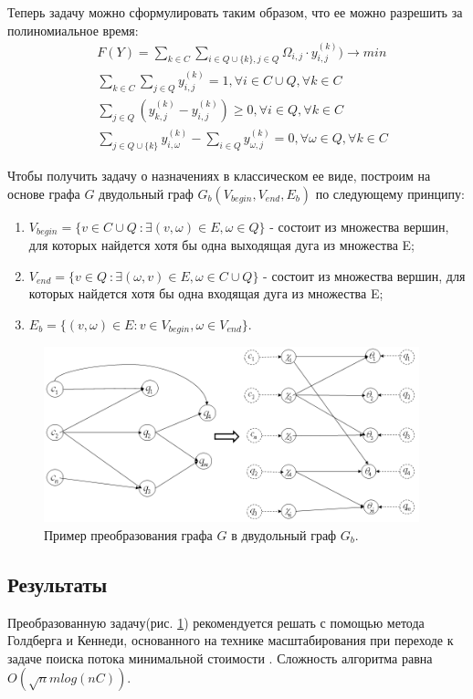 \documentclass[]{TAACpaper}
\begin{document}
Теперь задачу можно сформулировать таким образом, что ее можно разрешить за полиномиальное время:
\begin{align} 
  &F(Y) = 
    \sum_{k \in C}
     \sum_{i \in Q \cup  \{k\},j \in Q} 
     \Omega_{i,j}\cdot y^{(k)}_{i,j})
     \to min\\
& \sum_{k \in C}\sum_{j \in Q}y^{(k)}_{i,j} = 1, 
  \forall i \in C \cup Q, \forall k \in C \label{mod_cond_1}\\ 
& \sum_{j \in Q} ( 
       y^{(k)}_{k,j} -y^{(k)}_{i,j} ) \geq 0, 
       \forall i \in Q ,  \forall k \in C \label{mod_cond_2}\\
& \sum_{j \in Q \cup  \{k\}} y^{(k)}_{i,\omega} - 
  \sum_{i \in Q} y^{(k)}_{\omega,j} = 0, 
  \forall \omega \in Q ,  \forall k \in C \label{mod_cond_3}
\end{align}

Чтобы получить задачу о назначениях в классическом ее виде, построим на основе графа $G$ двудольный граф $G_b(V_{begin},V_{end},E_b)$ по следующему принципу:
\begin{enumerate}
\item $V_{begin} = \{v \in C \cup Q\ : \exists (v,\omega) \in E, \omega \in Q \}$ - состоит из множества вершин, для которых найдется хотя бы одна выходящая дуга из множества E;
\item $V_{end} = \{v  \in Q\ : \exists (\omega,v) \in E, \omega \in C \cup Q \}$ - состоит из множества вершин, для которых найдется хотя бы одна входящая дуга из множества E;
\item $E_b = \{(v,\omega) \in E: v \in V_{begin}, \omega \in V_{end} \}$.
\end{enumerate}

\begin{figure}[h]
\hfil\includegraphics[height=2.0in]{sign_graph}\hfil
\caption
{
  Пример преобразования графа $G$ в двудольный граф $G_b$.
}
\label{aba:fig1}
\end{figure}

\subsection{Результаты}
Преобразованную задачу(рис. \ref{aba:fig1}) рекомендуется решать с помощью метода Голдберга и Кеннеди,  основанного на технике масштабирования при переходе к задаче поиска потока минимальной стоимости \cite{Goldberg_Kennedy}. Сложность алгоритма равна $O(\sqrt{n}mlog(nC))$.
\end{document}
